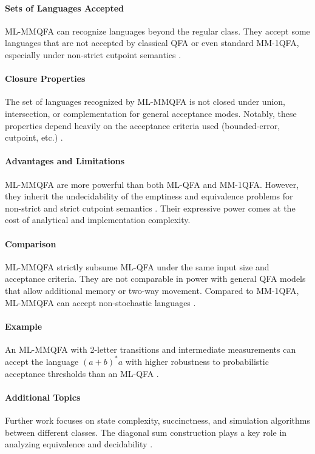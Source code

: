 \paragraph{Sets of Languages Accepted}
ML-MMQFA can recognize languages beyond the regular class. They accept some languages that are not accepted by classical QFA or even standard MM-1QFA, especially under non-strict cutpoint semantics \cite{qiu2009hierarchy, lin2012equivalence}.

\paragraph{Closure Properties}
The set of languages recognized by ML-MMQFA is not closed under union, intersection, or complementation for general acceptance modes. Notably, these properties depend heavily on the acceptance criteria used (bounded-error, cutpoint, etc.) \cite{qiu2009hierarchy}.

\paragraph{Advantages and Limitations}
ML-MMQFA are more powerful than both ML-QFA and MM-1QFA. However, they inherit the undecidability of the emptiness and equivalence problems for non-strict and strict cutpoint semantics \cite{qiu2008decidability, lin2012equivalence}. Their expressive power comes at the cost of analytical and implementation complexity.

\paragraph{Comparison} 
ML-MMQFA strictly subsume ML-QFA under the same input size and acceptance criteria. They are not comparable in power with general QFA models that allow additional memory or two-way movement. Compared to MM-1QFA, ML-MMQFA can accept non-stochastic languages \cite{qiu2009hierarchy}.

\paragraph{Example}
An ML-MMQFA with 2-letter transitions and intermediate measurements can accept the language $(a+b)^*a$ with higher robustness to probabilistic acceptance thresholds than an ML-QFA \cite{belovs2007multi}.

\paragraph{Additional Topics}
Further work focuses on state complexity, succinctness, and simulation algorithms between different classes. The diagonal sum construction plays a key role in analyzing equivalence and decidability \cite{lin2012equivalence}.



